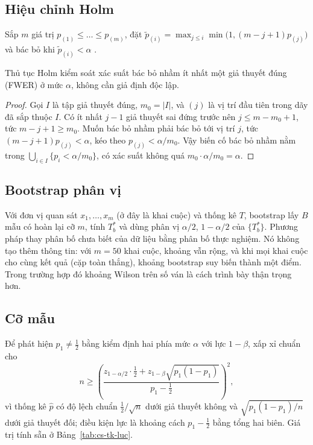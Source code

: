 \subsection{Hiệu chỉnh Holm}
Sắp $m$ giá trị $p_{(1)}\le\dots\le p_{(m)}$, đặt
$\tilde p_{(i)}=\max_{j\le i}\min\bigl(1,(m-j+1)p_{(j)}\bigr)$ và bác bỏ khi $\tilde p_{(i)}<\alpha$
\cite{holm1979}.
\begin{dinhly}
Thủ tục Holm kiểm soát xác suất bác bỏ nhầm ít nhất một giả thuyết đúng (FWER) ở mức $\alpha$, không cần giả định
độc lập.
\end{dinhly}
\begin{proof}
Gọi $I$ là tập giả thuyết đúng, $m_0=|I|$, và $(j)$ là vị trí đầu tiên trong dãy đã sắp thuộc $I$. Có ít nhất
$j-1$ giả thuyết sai đứng trước nên $j\le m-m_0+1$, tức $m-j+1\ge m_0$. Muốn bác bỏ nhầm phải bác bỏ tới vị trí
$j$, tức $(m-j+1)p_{(j)}<\alpha$, kéo theo $p_{(j)}<\alpha/m_0$. Vậy biến cố bác bỏ nhầm nằm trong
$\bigcup_{i\in I}\{p_i<\alpha/m_0\}$, có xác suất không quá $m_0\cdot\alpha/m_0=\alpha$.
\end{proof}

\subsection{Bootstrap phân vị}
Với đơn vị quan sát $x_1,\dots,x_m$ (ở đây là khai cuộc) và thống kê $T$, bootstrap \cite{efron1979} lấy $B$ mẫu
có hoàn lại cỡ $m$, tính $T^*_b$ và dùng phân vị $\alpha/2$, $1-\alpha/2$ của $\{T^*_b\}$. Phương pháp thay phân
bố chưa biết của dữ liệu bằng phân bố thực nghiệm. Nó không tạo thêm thông tin: với $m=50$ khai cuộc, khoảng vẫn
rộng, và khi mọi khai cuộc cho cùng kết quả (cặp toàn thắng), khoảng bootstrap suy biến thành một điểm. Trong
trường hợp đó khoảng Wilson trên số ván là cách trình bày thận trọng hơn.

\subsection{Cỡ mẫu}
Để phát hiện $p_1\neq\tfrac12$ bằng kiểm định hai phía mức $\alpha$ với lực $1-\beta$, xấp xỉ chuẩn cho
\begin{equation}
  n\ge\left(\frac{z_{1-\alpha/2}\cdot\frac12+z_{1-\beta}\sqrt{p_1(1-p_1)}}{p_1-\frac12}\right)^2,
\end{equation}
vì thống kê $\hat p$ có độ lệch chuẩn $\tfrac12/\sqrt n$ dưới giả thuyết không và $\sqrt{p_1(1-p_1)/n}$ dưới giả
thuyết đối; điều kiện lực là khoảng cách $p_1-\tfrac12$ bằng tổng hai biên. Giá trị tính sẵn ở
Bảng~\ref{tab:cs-tk-luc}.


